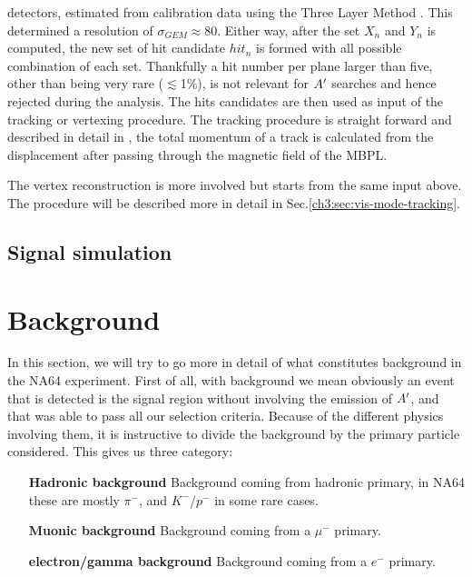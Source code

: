 detectors, estimated from calibration data using the Three Layer Method \cite{Bortfeldt:2014vvt}. This determined a resolution of $\sigma_{GEM} \approx 80$\mum. Either way, after the set $X_n$ and $Y_n$ is computed, the new set of hit candidate $hit_n$ is formed with all possible combination of each set. Thankfully a hit number per plane larger than five, other than being very rare ($\lesssim$1\%), is not relevant for $A'$ searches and hence rejected during the analysis. The hits candidates are then used as input of the tracking or vertexing procedure. The tracking procedure is straight forward and described in detail in \cite{dbanerjee-thesis}, the total momentum of a track is calculated from the displacement after passing through the magnetic field of the MBPL.



The vertex reconstruction is more involved but starts from the same input above. The procedure will be described more in detail in Sec.\ref{ch3:sec:vis-mode-tracking}.

\subsection{Signal simulation}
\label{ch3:sec:geant4-signal}

\section{Background}
\label{ch3:sec:bkg}

In this section, we will try to go more in detail of what constitutes background in the NA64 experiment. First of all, with background we mean obviously an event that is detected is the signal region without involving the emission of $A'$, and that was able to pass all our selection criteria. Because of the different physics involving them, it is instructive to divide the background by the primary particle considered. This gives us three category:

\begin{itemize}
\item[\textbf{Hadronic background}] Background coming from hadronic primary, in NA64 these are mostly $\pi^-$, and $K^-$/$p^-$ in some rare cases.
\item[\textbf{Muonic background}] Background coming from a $\mu^-$ primary.
\item[\textbf{electron/gamma background}] Background coming from a $e^-$ primary.
\end{itemize}

